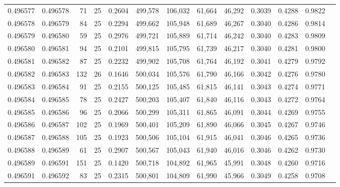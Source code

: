 \begin{tabular}{rrrrrrrrrrrrr}
0.496577 & 0.496578 &    71 &  25 &                                     0.2604 & 499,578 & 106,032 &  61,664 &  46,292 & 0.3039 & 0.4288 & 0.9822 \\
0.496578 & 0.496579 &    84 &  25 &                                     0.2294 & 499,662 & 105,948 &  61,689 &  46,267 & 0.3040 & 0.4286 & 0.9814 \\
0.496579 & 0.496580 &    59 &  25 &                                     0.2976 & 499,721 & 105,889 &  61,714 &  46,242 & 0.3040 & 0.4283 & 0.9809 \\
0.496580 & 0.496581 &    94 &  25 &                                     0.2101 & 499,815 & 105,795 &  61,739 &  46,217 & 0.3040 & 0.4281 & 0.9800 \\
0.496581 & 0.496582 &    87 &  25 &                                     0.2232 & 499,902 & 105,708 &  61,764 &  46,192 & 0.3041 & 0.4279 & 0.9792 \\
0.496582 & 0.496583 &   132 &  26 &                                     0.1646 & 500,034 & 105,576 &  61,790 &  46,166 & 0.3042 & 0.4276 & 0.9780 \\
0.496583 & 0.496584 &    91 &  25 &                                     0.2155 & 500,125 & 105,485 &  61,815 &  46,141 & 0.3043 & 0.4274 & 0.9771 \\
0.496584 & 0.496585 &    78 &  25 &                                     0.2427 & 500,203 & 105,407 &  61,840 &  46,116 & 0.3043 & 0.4272 & 0.9764 \\
0.496585 & 0.496586 &    96 &  25 &                                     0.2066 & 500,299 & 105,311 &  61,865 &  46,091 & 0.3044 & 0.4269 & 0.9755 \\
0.496586 & 0.496587 &   102 &  25 &                                     0.1969 & 500,401 & 105,209 &  61,890 &  46,066 & 0.3045 & 0.4267 & 0.9746 \\
0.496587 & 0.496588 &   105 &  25 &                                     0.1923 & 500,506 & 105,104 &  61,915 &  46,041 & 0.3046 & 0.4265 & 0.9736 \\
0.496588 & 0.496589 &    61 &  25 &                                     0.2907 & 500,567 & 105,043 &  61,940 &  46,016 & 0.3046 & 0.4262 & 0.9730 \\
0.496589 & 0.496591 &   151 &  25 &                                     0.1420 & 500,718 & 104,892 &  61,965 &  45,991 & 0.3048 & 0.4260 & 0.9716 \\
0.496591 & 0.496592 &    83 &  25 &                                     0.2315 & 500,801 & 104,809 &  61,990 &  45,966 & 0.3049 & 0.4258 & 0.9708 \\

\end{tabular}
